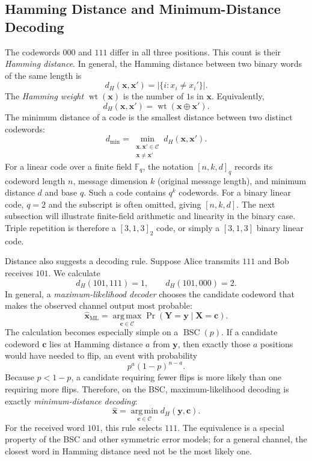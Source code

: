 \subsection{Hamming Distance and Minimum-Distance Decoding}

The codewords $000$ and $111$ differ in all three positions. This count is their \emph{Hamming distance}. In general, the Hamming distance between two binary words of the same length is
\[
d_H(\mathbf{x},\mathbf{x}')
=\big|\{i:x_i\neq x_i'\}\big|.
\]
The \emph{Hamming weight} $\operatorname{wt}(\mathbf{x})$ is the number of $1$s in $\mathbf{x}$. Equivalently,
\[
d_H(\mathbf{x},\mathbf{x}')
=\operatorname{wt}(\mathbf{x}\oplus\mathbf{x}').
\]
The minimum distance of a code is the smallest distance between two distinct codewords:
\begin{equation}
d_{\min}=\min_{\substack{\mathbf{x},\mathbf{x}'\in\mathcal{C}\\
\mathbf{x}\neq\mathbf{x}'}}
d_H(\mathbf{x},\mathbf{x}').
\label{eq:minimum-distance}
\end{equation}
For a linear code over a finite field $\mathbb{F}_q$, the notation $[n,k,d]_q$ records its codeword length $n$, message dimension $k$ (original message length), and minimum distance $d$ and base $q$. Such a code contains $q^k$ codewords. For a binary linear code, $q=2$ and the subscript is often omitted, giving $[n,k,d]$. The next subsection will illustrate finite-field arithmetic and linearity in the binary case. Triple repetition is therefore a $[3,1,3]_2$ code, or simply a $[3,1,3]$ binary linear code.

Distance also suggests a decoding rule. Suppose Alice transmits $111$ and Bob receives $101$. We calculate
\[
d_H(101,111)=1,
\qquad
d_H(101,000)=2.
\]
In general, a \emph{maximum-likelihood decoder} chooses the candidate codeword that makes the observed channel output most probable:
\[
\hat{\mathbf{x}}_{\mathrm{ML}}
=\underset{\mathbf{c}\in\mathcal{C}}{\operatorname{arg\,max}}
\Pr(\mathbf{Y}=\mathbf{y}\mid\mathbf{X}=\mathbf{c}).
\]
The calculation becomes especially simple on a $\operatorname{BSC}(p)$. If a candidate codeword $\mathbf{c}$ lies at Hamming distance $a$ from $\mathbf{y}$, then exactly those $a$ positions would have needed to flip, an event with probability
\[
p^a(1-p)^{n-a}.
\]
Because $p<1-p$, a candidate requiring fewer flips is more likely than one requiring more flips. Therefore, on the BSC, maximum-likelihood decoding is exactly \emph{minimum-distance decoding}:
\[
\hat{\mathbf{x}}
=\underset{\mathbf{c}\in\mathcal{C}}{\operatorname{arg\,min}}
d_H(\mathbf{y},\mathbf{c}).
\]
For the received word $101$, this rule selects $111$. The equivalence is a special property of the BSC and other symmetric error models; for a general channel, the closest word in Hamming distance need not be the most likely one.

